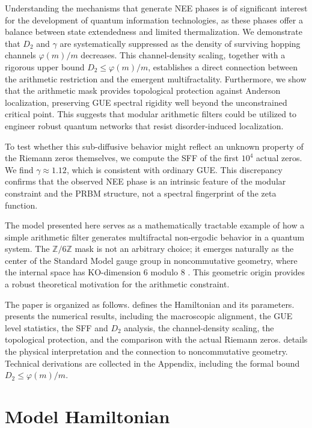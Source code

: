 \documentclass[11pt,a4paper]{article}
\begin{document}
Understanding the mechanisms that generate NEE phases is of significant interest for the development of quantum information technologies, as these phases offer a balance between state extendedness and limited thermalization. We demonstrate that $D_2$ and $\gamma$ are systematically suppressed as the density of surviving hopping channels $\varphi(m)/m$ decreases. This channel-density scaling, together with a rigorous upper bound $D_2 \le \varphi(m)/m$, establishes a direct connection between the arithmetic restriction and the emergent multifractality. Furthermore, we show that the arithmetic mask provides topological protection against Anderson localization, preserving GUE spectral rigidity well beyond the unconstrained critical point. This suggests that modular arithmetic filters could be utilized to engineer robust quantum networks that resist disorder-induced localization.

To test whether this sub-diffusive behavior might reflect an unknown property of the Riemann zeros themselves, we compute the SFF of the first $10^4$ actual zeros. We find $\gamma \approx 1.12$, which is consistent with ordinary GUE. This discrepancy confirms that the observed NEE phase is an intrinsic feature of the modular constraint and the PRBM structure, not a spectral fingerprint of the zeta function.

The model presented here serves as a mathematically tractable example of how a simple arithmetic filter generates multifractal non-ergodic behavior in a quantum system. The $\mathbb{Z}/6\mathbb{Z}$ mask is not an arbitrary choice; it emerges naturally as the center of the Standard Model gauge group in noncommutative geometry, where the internal space has KO-dimension 6 modulo 8 \cite{Connes2008,Chamseddine2007}. This geometric origin provides a robust theoretical motivation for the arithmetic constraint.

The paper is organized as follows.  defines the Hamiltonian and its parameters.  presents the numerical results, including the macroscopic alignment, the GUE level statistics, the SFF and $D_2$ analysis, the channel-density scaling, the topological protection, and the comparison with the actual Riemann zeros.  details the physical interpretation and the connection to noncommutative geometry. Technical derivations are collected in the Appendix, including the formal bound $D_2 \le \varphi(m)/m$.

\section{Model Hamiltonian}
\label{sec:model}
\end{document}
